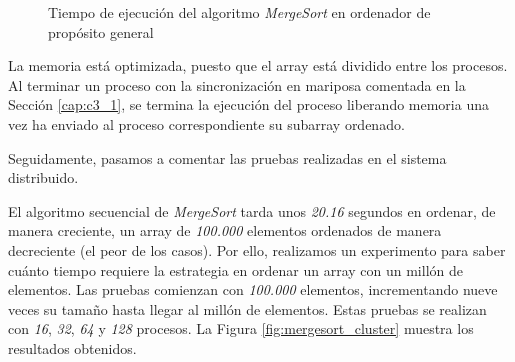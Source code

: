 \begin{figure}[!h]
	\caption{Tiempo de ejecución del algoritmo \textit{MergeSort} en ordenador de propósito general}
	\label{fig:mergesort_hist}
\end{figure}



La memoria está optimizada, puesto que el array está dividido entre los procesos. Al terminar un proceso con la sincronización en mariposa comentada en la Sección \ref{cap:c3_1}, se termina la ejecución del proceso liberando memoria una vez ha enviado al proceso correspondiente su subarray ordenado.



Seguidamente, pasamos a comentar las pruebas realizadas en el sistema distribuido.

El algoritmo secuencial de \textit{MergeSort} tarda unos \textit{20.16} segundos en ordenar, de manera creciente, un array de \textit{100.000} elementos ordenados de manera decreciente (el peor de los casos). Por ello, realizamos un experimento para saber cuánto tiempo requiere la estrategia en ordenar un array con un millón de elementos. Las pruebas comienzan con \textit{100.000} elementos, incrementando nueve veces su tamaño hasta llegar al millón de elementos. Estas pruebas se realizan con \textit{16}, \textit{32}, \textit{64} y \textit{128} procesos. La Figura \ref{fig:mergesort_cluster} muestra los resultados obtenidos. 

